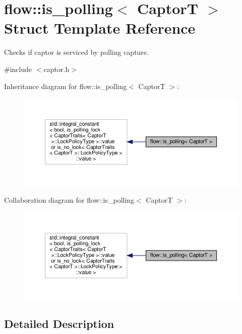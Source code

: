 \hypertarget{structflow_1_1is__polling}{}\section{flow\+:\+:is\+\_\+polling$<$ CaptorT $>$ Struct Template Reference}
\label{structflow_1_1is__polling}


Checks if captor is serviced by polling capture.  




{\ttfamily \#include $<$captor.\+h$>$}



Inheritance diagram for flow\+:\+:is\+\_\+polling$<$ CaptorT $>$\+:\nopagebreak
\begin{figure}[H]
\begin{center}
\leavevmode
\includegraphics[width=350pt]{structflow_1_1is__polling__inherit__graph}
\end{center}
\end{figure}


Collaboration diagram for flow\+:\+:is\+\_\+polling$<$ CaptorT $>$\+:\nopagebreak
\begin{figure}[H]
\begin{center}
\leavevmode
\includegraphics[width=350pt]{structflow_1_1is__polling__coll__graph}
\end{center}
\end{figure}


\subsection{Detailed Description}

